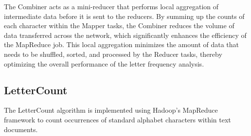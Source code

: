 The Combiner acts as a mini-reducer that performs local aggregation of intermediate data before it is sent to the reducers.
By summing up the counts of each character within the Mapper tasks, the Combiner reduces the volume of data transferred
across the network, which significantly enhances the efficiency of the MapReduce job. This local aggregation minimizes
the amount of data that needs to be shuffled, sorted, and processed by the Reducer tasks, thereby optimizing the overall
performance of the letter frequency analysis.

\subsection{LetterCount}
The LetterCount algorithm is implemented using Hadoop's MapReduce framework to count occurrences of standard alphabet
characters within text documents.

